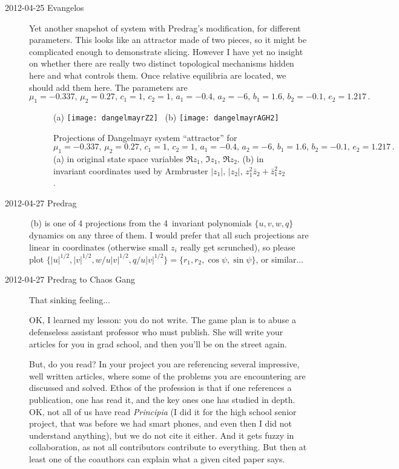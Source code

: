 \begin{description}
\item[2012-04-25 Evangelos] Yet another snapshot of {\twoMode}
system with Predrag's modification, for different parameters. This looks
like an attractor made of two pieces, so it might be complicated enough
to demonstrate slicing. However I have yet no insight on whether there
are really two distinct topological mechanisms hidden here and what
controls them. Once relative equilibria are located, we should add them
here. The parameters are
\[
 \mu_1 = -0.337,\, \mu_2 = 0.27,\, c_1 = 1,\, c_2 = 1,\,
 a_1 = -0.4,\, a_2 = -6,\, b_1 = 1.6,\,  b_2 = -0.1,\, e_2 = 1.217
 \,.
\]

 \begin{figure}[h]
\centering
 (a) \texttt{[image: dangelmayrZ2]}~
 (b) \texttt{[image: dangelmayrAGH2]}~
\caption{Projections of Dangelmayr system 
``attractor'' for $\mu_1 = -0.337,\, \mu_2 = 0.27,\, c_1 = 1,\, c_2 = 1,\,
a_1 = -0.4,\, a_2 = -6,\, b_1 = 1.6,\,  b_2 = -0.1,\, e_2 = 1.217\,.$
(a) in original state space variables $\Re z_1,\,\Im z_1,\,\Re z_2$.
(b) in invariant coordinates used by
Armbruster \etal{}
$|z_1|,\, |z_2|,\, z_1^2 \bar{z}_2 + \bar{z}_1^2 z_2$.
}
 \label{fig:dangelmayrChaos2}
\end{figure}

\item[2012-04-27 Predrag] \,(b) is one of 4
projections from the 4\dmn\ invariant polynomials $\{u,v,w,q\}$ dynamics
on any three of them. I would prefer that all such projections are linear
in coordinates (otherwise small $z_i$ really get scrunched), so please
plot $\{|u|^{1/2},|v|^{1/2},w/u |v|^{1/2} ,q/u |v|^{1/2} \}
= \{r_1,r_2, \cos\psi, \sin\psi \}$, or similar...

\item[2012-04-27 Predrag to Chaos Gang] That sinking feeling...

OK, I learned my lesson:
{you} do not write. The game plan is to abuse a defenseless assistant
professor who must publish. She will write your articles for you in grad
school, and then you'll be on the street again.

But, do you read? In your project you are referencing several impressive,
well written {\twoMode} articles, where some of the problems you are
encountering are discussed and solved. Ethos of the profession is that if
one references a publication, one has read it, and the key ones one has
studied in depth. OK, not all of us have read \emph{Principia} (I did it
for the high school senior project, that was before we had smart phones,
and even then I did not understand anything), but we do not cite it
either. And it gets fuzzy in collaboration, as not all contributors
contribute to everything. But then at least one of the coauthors can
explain what a given cited paper says.


\end{description}
